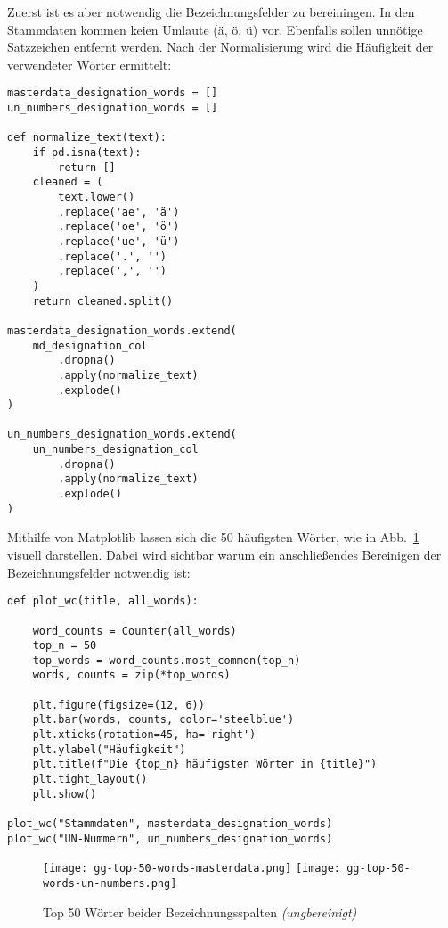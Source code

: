 Zuerst ist es aber notwendig die Bezeichnungsfelder zu bereiningen. In den
Stammdaten kommen keien Umlaute (ä, ö, ü) vor. Ebenfalls sollen unnötige 
Satzzeichen entfernt werden. Nach der Normalisierung wird die Häufigkeit der
verwendeter Wörter ermittelt:\\

\begin{lstlisting}
masterdata_designation_words = []
un_numbers_designation_words = []

def normalize_text(text):
    if pd.isna(text):
        return []
    cleaned = (
        text.lower()
        .replace('ae', 'ä')
        .replace('oe', 'ö')
        .replace('ue', 'ü')
        .replace('.', '')
        .replace(',', '')
    )
    return cleaned.split()

masterdata_designation_words.extend(
    md_designation_col
        .dropna()
        .apply(normalize_text)
        .explode()
)

un_numbers_designation_words.extend(
    un_numbers_designation_col
        .dropna()
        .apply(normalize_text)
        .explode()
)
\end{lstlisting}

\newpage

Mithilfe von Matplotlib lassen sich die 50 häufigsten Wörter, wie in
Abb.~\ref{fig:top-50-unfiltered} visuell darstellen. Dabei wird sichtbar warum
ein anschließendes Bereinigen der Bezeichnungsfelder notwendig ist:\\

\begin{lstlisting}
def plot_wc(title, all_words):

    word_counts = Counter(all_words)
    top_n = 50
    top_words = word_counts.most_common(top_n)
    words, counts = zip(*top_words)

    plt.figure(figsize=(12, 6))
    plt.bar(words, counts, color='steelblue')
    plt.xticks(rotation=45, ha='right')
    plt.ylabel("Häufigkeit")
    plt.title(f"Die {top_n} häufigsten Wörter in {title}")
    plt.tight_layout()
    plt.show()

plot_wc("Stammdaten", masterdata_designation_words)
plot_wc("UN-Nummern", un_numbers_designation_words)
\end{lstlisting}

\begin{figure}[htbp]
  \centering
  \texttt{[image: gg-top-50-words-masterdata.png]}
  \texttt{[image: gg-top-50-words-un-numbers.png]}
  \caption{Top 50 Wörter beider Bezeichnungsspalten \textit{(ungbereinigt)}}
  \label{fig:top-50-unfiltered}
\end{figure}

